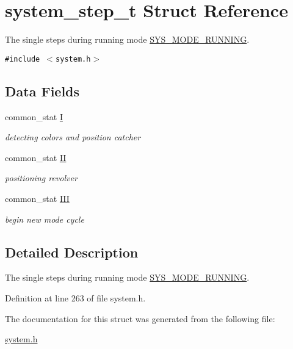 \hypertarget{structsystem__step__t}{
\section{system\_\-step\_\-t Struct Reference}
\label{structsystem__step__t}
}
The single steps during running mode \hyperlink{system_8h_6e4cea4b6246f491c526211f5405627d564529220e61e848983d8eb9d7f87736}{SYS\_\-MODE\_\-RUNNING}.  


{\tt \#include $<$system.h$>$}

\subsection*{Data Fields}
\begin{CompactItemize}
\item 
\hypertarget{structsystem__step__t_48ef78a306bf18012f7621ce4918b423}{
common\_\-stat \hyperlink{structsystem__step__t_48ef78a306bf18012f7621ce4918b423}{I}}
\label{structsystem__step__t_48ef78a306bf18012f7621ce4918b423}

\begin{CompactList}\small\item\em detecting colors and position catcher \item\end{CompactList}\item 
\hypertarget{structsystem__step__t_fdb071a3fec04fedd7c6b65ecf627087}{
common\_\-stat \hyperlink{structsystem__step__t_fdb071a3fec04fedd7c6b65ecf627087}{II}}
\label{structsystem__step__t_fdb071a3fec04fedd7c6b65ecf627087}

\begin{CompactList}\small\item\em positioning revolver \item\end{CompactList}\item 
\hypertarget{structsystem__step__t_8177fdec77832c82cf018a948a1d7ec0}{
common\_\-stat \hyperlink{structsystem__step__t_8177fdec77832c82cf018a948a1d7ec0}{III}}
\label{structsystem__step__t_8177fdec77832c82cf018a948a1d7ec0}

\begin{CompactList}\small\item\em begin new mode cycle \item\end{CompactList}\end{CompactItemize}


\subsection{Detailed Description}
The single steps during running mode \hyperlink{system_8h_6e4cea4b6246f491c526211f5405627d564529220e61e848983d8eb9d7f87736}{SYS\_\-MODE\_\-RUNNING}. 

Definition at line 263 of file system.h.

The documentation for this struct was generated from the following file:\begin{CompactItemize}
\item 
\hyperlink{system_8h}{system.h}\end{CompactItemize}
